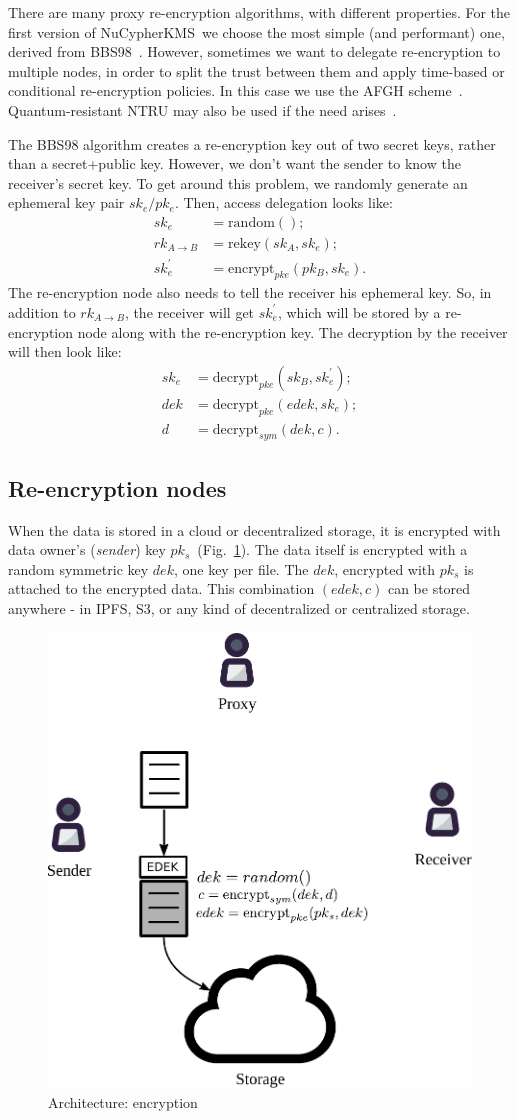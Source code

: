 \documentclass[notitlepage,longbibliography]{revtex4-1}
\newcommand{\kms}{NuCypherKMS}
\begin{document}
There are many proxy re-encryption algorithms, with different properties.
For the first version of \kms~we choose the most simple (and performant) one, derived from BBS98~\cite{BBS98}.
However, sometimes we want to delegate re-encryption to multiple nodes, in order to split the trust between them and apply time-based or conditional
re-encryption policies.
In this case we use the AFGH scheme~\cite{AFGH}.
Quantum-resistant NTRU may also be used if the need arises~\cite{wiki:ntru,ntrureencrypt}.

The BBS98 algorithm creates a re-encryption key out of two secret keys, rather than a secret+public key.
However, we don't want the sender to know the receiver's secret key.
To get around this problem, we randomly generate an ephemeral key pair $sk_e/pk_e$.
Then, access delegation looks like:
\begin{align}
    sk_e &= \text{random}();\\
    rk_{A\rightarrow B} &= \text{rekey}(sk_A, sk_e);\\
    sk_e^{\prime} &= \text{encrypt}_{pke}(pk_B, sk_e).
\end{align}
The re-encryption node also needs to tell the receiver his ephemeral key.
So, in addition to $rk_{A\rightarrow B}$, the receiver will get $sk_e^{\prime}$, which will be stored by a re-encryption node along with the re-encryption key.
The decryption by the receiver will then look like:
\begin{align}
    sk_e &= \text{decrypt}_{pke}(sk_B, sk_e^{\prime});\\
    dek &= \text{decrypt}_{pke}(edek, sk_e);\\
    d &= \text{decrypt}_{sym}(dek, c).
\end{align}

\subsection{Re-encryption nodes}

When the data is stored in a cloud or decentralized storage, it is encrypted with data owner's (\emph{sender}) key $pk_s$~(Fig.~\ref{fig:arch-encrypt}).
The data itself is encrypted with a random symmetric key $dek$, one key per file.
The $dek$, encrypted with $pk_s$ is attached to the encrypted data.
This combination $(edek, c)$ can be stored anywhere - in IPFS, S3, or any kind of decentralized or centralized storage.
\begin{figure}
\centering
    \includegraphics[width=0.4\columnwidth]{pdf/encrypt.pdf}
    \caption{Architecture: encryption}
    \label{fig:arch-encrypt}
\end{figure}
\end{document}
